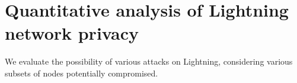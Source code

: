 \chapter{Quantitative analysis of Lightning network privacy}

\label{Chapter07_LN_attacks}

We evaluate the possibility of various attacks on Lightning, considering various subsets of nodes potentially compromised.
